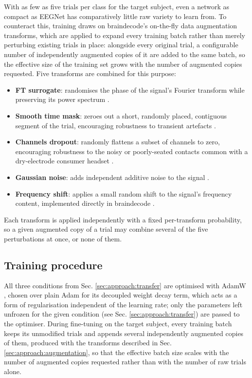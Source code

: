 With as few as five trials per class for the target subject, even a network as compact as EEGNet has comparatively little raw variety to learn from. To counteract this, training draws on braindecode's on-the-fly data augmentation transforms, which are applied to expand every training batch rather than merely perturbing existing trials in place: alongside every original trial, a configurable number of independently augmented copies of it are added to the same batch, so the effective size of the training set grows with the number of augmented copies requested. Five transforms are combined for this purpose:

\begin{itemize}
    \item \textbf{FT surrogate}: randomises the phase of the signal's Fourier transform while preserving its power spectrum \cite{schwabedal-2018}.
    \item \textbf{Smooth time mask}: zeroes out a short, randomly placed, contiguous segment of the trial, encouraging robustness to transient artefacts \cite{cheng-2020}.
    \item \textbf{Channels dropout}: randomly flattens a subset of channels to zero, encouraging robustness to the noisy or poorly-seated contacts common with a dry-electrode consumer headset \cite{saeed-2020}.
    \item \textbf{Gaussian noise}: adds independent additive noise to the signal \cite{wang-2018-augmentation}.
    \item \textbf{Frequency shift}: applies a small random shift to the signal's frequency content, implemented directly in braindecode \cite{schirrmeister-2017}.
\end{itemize}

Each transform is applied independently with a fixed per-transform probability, so a given augmented copy of a trial may combine several of the five perturbations at once, or none of them.

\subsection{Training procedure}
\label{sec:approach:training}

All three conditions from Sec. \ref{sec:approach:transfer} are optimised with AdamW \cite{loshchilov-2019}, chosen over plain Adam for its decoupled weight decay term, which acts as a form of regularisation independent of the learning rate; only the parameters left unfrozen for the given condition (see Sec. \ref{sec:approach:transfer}) are passed to the optimiser. During fine-tuning on the target subject, every training batch keeps its unmodified trials and appends several independently augmented copies of them, produced with the transforms described in Sec. \ref{sec:approach:augmentation}, so that the effective batch size scales with the number of augmented copies requested rather than with the number of raw trials alone.

